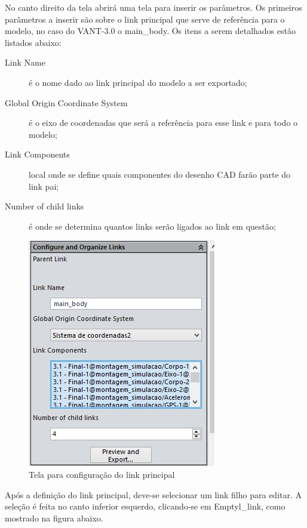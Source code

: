No canto direito da tela abrirá uma tela para inserir os parâmetros. Os primeiros parâmetros a inserir são sobre o link principal que serve de referência para o modelo, no caso do VANT-3.0 o main\_body. Os itens a serem detalhados estão listados abaixo:

\begin{description}
\item [Link Name] é o nome dado ao link principal do modelo a ser exportado;
\item [Global Origin Coordinate System] é o eixo de coordenadas que será a referência para esse link e para todo o modelo; 
\item [Link Components] local onde se define quais componentes do desenho CAD farão parte do link pai; 
\item [Number of child links] é onde se determina quantos links serão ligados ao link em questão;
\end{description}

\begin{figure}[!htb]%
\centering %
\includegraphics[scale=1]{Imagens/main_body.JPG} %
\caption{Tela para configuração do link principal} %
\end{figure} %

Após a definição do link principal, deve-se selecionar um link filho para editar. A seleção é feita no canto inferior esquerdo, clicando-se em Emptyl\_link, como mostrado na figura abaixo.

